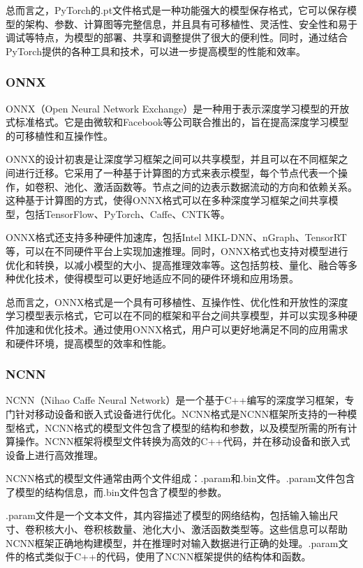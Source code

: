 \documentclass{ctexart}
\numberwithin{equation}{section}%
\numberwithin{figure}{section}%
\numberwithin{table}{section}%
\begin{document}
	总而言之，PyTorch的.pt文件格式是一种功能强大的模型保存格式，它可以保存模型的架构、参数、计算图等完整信息，并且具有可移植性、灵活性、安全性和易于调试等特点，为模型的部署、共享和调整提供了很大的便利性。同时，通过结合PyTorch提供的各种工具和技术，可以进一步提高模型的性能和效率。
	
	\subsubsection{ONNX}
	ONNX（Open Neural Network Exchange）是一种用于表示深度学习模型的开放式标准格式。它是由微软和Facebook等公司联合推出的，旨在提高深度学习模型的可移植性和互操作性。
	
	ONNX的设计初衷是让深度学习框架之间可以共享模型，并且可以在不同框架之间进行迁移。它采用了一种基于计算图的方式来表示模型，每个节点代表一个操作，如卷积、池化、激活函数等。节点之间的边表示数据流动的方向和依赖关系。这种基于计算图的方式，使得ONNX格式可以在多种深度学习框架之间共享模型，包括TensorFlow、PyTorch、Caffe、CNTK等。
	
	ONNX格式还支持多种硬件加速库，包括Intel MKL-DNN、nGraph、TensorRT等，可以在不同硬件平台上实现加速推理。同时，ONNX格式也支持对模型进行优化和转换，以减小模型的大小、提高推理效率等。这包括剪枝、量化、融合等多种优化技术，使得模型可以更好地适应不同的硬件环境和应用场景。
	
	总而言之，ONNX格式是一个具有可移植性、互操作性、优化性和开放性的深度学习模型表示格式，它可以在不同的框架和平台之间共享模型，并可以实现多种硬件加速和优化技术。通过使用ONNX格式，用户可以更好地满足不同的应用需求和硬件环境，提高模型的效率和性能。
	
	\subsubsection{NCNN}
	NCNN（Nihao Caffe Neural Network）是一个基于C++编写的深度学习框架，专门针对移动设备和嵌入式设备进行优化。NCNN格式是NCNN框架所支持的一种模型格式，NCNN格式的模型文件包含了模型的结构和参数，以及模型所需的所有计算操作。NCNN框架将模型文件转换为高效的C++代码，并在移动设备和嵌入式设备上进行高效推理。
	
	NCNN格式的模型文件通常由两个文件组成：.param和.bin文件。.param文件包含了模型的结构信息，而.bin文件包含了模型的参数。
	
	.param文件是一个文本文件，其内容描述了模型的网络结构，包括输入输出尺寸、卷积核大小、卷积核数量、池化大小、激活函数类型等。这些信息可以帮助NCNN框架正确地构建模型，并在推理时对输入数据进行正确的处理。.param文件的格式类似于C++的代码，使用了NCNN框架提供的结构体和函数。
	
\end{document}
